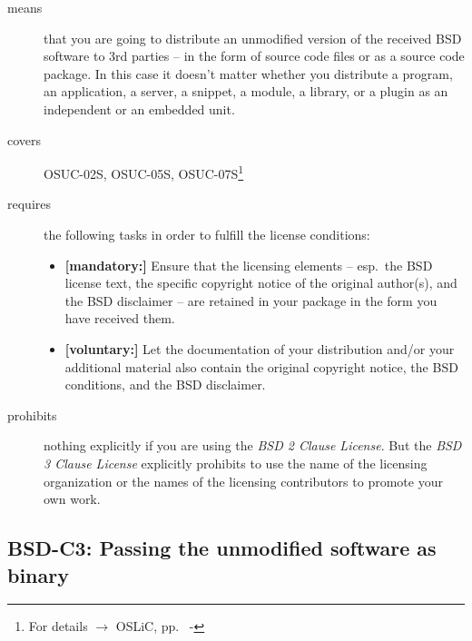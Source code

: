 \begin{description}
\item[means] that you are going to distribute an unmodified version of the
received BSD software to 3rd parties -- in the form of source code files or as a
source code package. In this case it doesn't matter whether you distribute a
program, an application, a server, a snippet, a module, a library, or a plugin
as an independent or an embedded unit.

\item[covers] OSUC-02S, OSUC-05S, OSUC-07S\footnote{For details $\rightarrow$
OSLiC, pp.\ \pageref{OSUC-02S-DEF} - \pageref{OSUC-07S-DEF}}

\item[requires] the following tasks in order to fulfill the license conditions:
\begin{itemize}
  \item \textbf{[mandatory:]} Ensure that the licensing elements -- esp.\ the
  BSD license text, the specific copyright notice of the original author(s), and
  the BSD disclaimer -- are retained in your package in the form you have
  received them.
  \item \textbf{[voluntary:]} Let the documentation of your distribution
  and/or your additional material also contain the original copyright notice, the
  BSD conditions, and the BSD disclaimer.
\end{itemize}

\item[prohibits] nothing explicitly if you are using the \emph{BSD 2 Clause
License}. But the \emph{BSD 3 Clause License} explicitly prohibits to use the
name of the licensing organization or the names of the licensing contributors to
promote your own work.

\end{description}

\subsection{BSD-C3: Passing the unmodified software as binary}
\label{OSUC-02B-BSD} \label{OSUC-05B-BSD} \label{OSUC-07B-BSD} 

